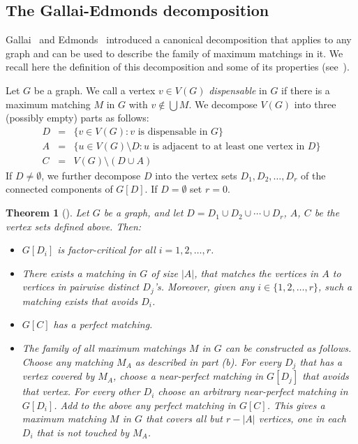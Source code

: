 \documentclass{article}
\newtheorem{theorem}{Theorem}[section]
\theoremstyle{definition}
\begin{document}
\subsection{The Gallai-Edmonds decomposition}
Gallai~\cite{Ga63, Ga64} and Edmonds~\cite{Ed} introduced a canonical decomposition that applies to any graph and can be used to describe the family of maximum matchings in it. We recall here the definition of this decomposition and some of its properties (see~\cite[Theorem 3.2.1]{LP}).

Let $G$ be a graph. We call a vertex $v \in V(G)$ \emph{dispensable} in $G$ if there is a maximum matching $M$ in $G$ with $v \notin \bigcup M$. We decompose $V(G)$ into three (possibly empty) parts as follows:
\begin{eqnarray*}
D & = & \{ v \in V(G): v \textrm{ is dispensable in } G\} \\
A & = & \{ u \in V(G) \setminus D: u \textrm{ is adjacent to at least one vertex in } D\} \\
C & = & V(G) \setminus (D \cup A)
\end{eqnarray*}
If $D \ne \emptyset$, we further decompose $D$ into the vertex sets $D_1, D_2, \ldots , D_r$ of the connected components of $G[D]$. If $D = \emptyset$ set $r=0$.
\begin{theorem}[{\cite{Ga63, Ga64, Ed}}] \label{thm:GE}
Let $G$ be a graph, and let $D = D_1 \cup D_2 \cup \cdots \cup D_r$, $A$, $C$ be the vertex sets defined above. Then:
\begin{itemize}
    \item[(a)] $G[D_i]$ is factor-critical for all $i=1,2, \ldots , r$.
    \item[(b)] There exists a matching in $G$ of size $|A|$, that matches the vertices in $A$ to vertices in pairwise distinct $D_j$'s. Moreover, given any $i \in \{1,2, \ldots , r\}$, such a matching exists that avoids $D_i$.
    \item[(c)] $G[C]$ has a perfect matching.
    \item[(d)] The family of all maximum matchings $M$ in $G$ can be constructed as follows. Choose any matching $M_A$ as described in part (b). For every $D_j$ that has a vertex covered by $M_A$, choose a near-perfect matching in $G[D_j]$ that avoids that vertex. For every other $D_i$ choose an arbitrary near-perfect matching in $G[D_i]$. Add to the above any perfect matching in $G[C]$. This gives a maximum matching $M$ in $G$ that covers all but $r - |A|$ vertices, one in each $D_i$ that is not touched by $M_A$.
\end{itemize}
\end{theorem}
\end{document}
